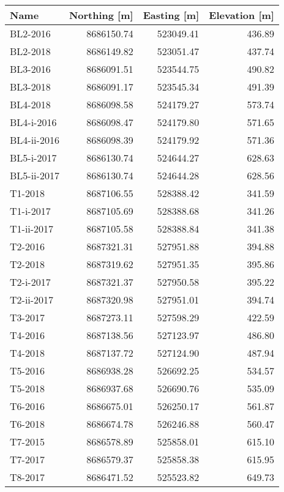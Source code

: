 \begin{tabular}{lrrr}
\toprule
        Name &  Northing [m] &  Easting [m] &  Elevation [m] \\
\midrule
    BL2-2016 &    8686150.74 &    523049.41 &         436.89 \\
    BL2-2018 &    8686149.82 &    523051.47 &         437.74 \\
    BL3-2016 &    8686091.51 &    523544.75 &         490.82 \\
    BL3-2018 &    8686091.17 &    523545.34 &         491.39 \\
    BL4-2018 &    8686098.58 &    524179.27 &         573.74 \\
  BL4-i-2016 &    8686098.47 &    524179.80 &         571.65 \\
 BL4-ii-2016 &    8686098.39 &    524179.92 &         571.36 \\
  BL5-i-2017 &    8686130.74 &    524644.27 &         628.63 \\
 BL5-ii-2017 &    8686130.74 &    524644.28 &         628.56 \\
     T1-2018 &    8687106.55 &    528388.42 &         341.59 \\
   T1-i-2017 &    8687105.69 &    528388.68 &         341.26 \\
  T1-ii-2017 &    8687105.58 &    528388.84 &         341.38 \\
     T2-2016 &    8687321.31 &    527951.88 &         394.88 \\
     T2-2018 &    8687319.62 &    527951.35 &         395.86 \\
   T2-i-2017 &    8687321.37 &    527950.58 &         395.22 \\
  T2-ii-2017 &    8687320.98 &    527951.01 &         394.74 \\
     T3-2017 &    8687273.11 &    527598.29 &         422.59 \\
     T4-2016 &    8687138.56 &    527123.97 &         486.80 \\
     T4-2018 &    8687137.72 &    527124.90 &         487.94 \\
     T5-2016 &    8686938.28 &    526692.25 &         534.57 \\
     T5-2018 &    8686937.68 &    526690.76 &         535.09 \\
     T6-2016 &    8686675.01 &    526250.17 &         561.87 \\
     T6-2018 &    8686674.78 &    526246.88 &         560.47 \\
     T7-2015 &    8686578.89 &    525858.01 &         615.10 \\
     T7-2017 &    8686579.37 &    525858.38 &         615.95 \\
     T8-2017 &    8686471.52 &    525523.82 &         649.73 \\
\bottomrule
\end{tabular}
